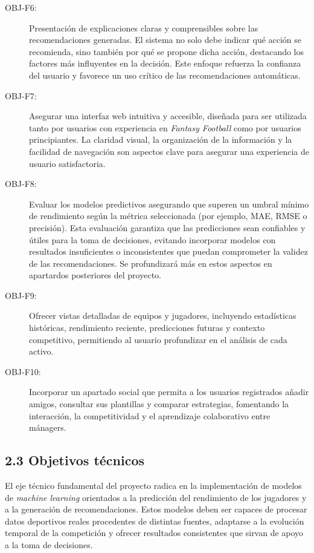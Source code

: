 \begin{description}
\item[OBJ-F6:] Presentación de explicaciones claras y comprensibles sobre las recomendaciones 
generadas. El sistema no solo debe indicar qué acción se recomienda, sino también por qué se 
propone dicha acción, destacando los factores más influyentes en la decisión. Este enfoque 
refuerza la confianza del usuario y favorece un uso crítico de las recomendaciones 
automáticas.

\item[OBJ-F7:] Asegurar una interfaz web intuitiva y accesible, diseñada para ser utilizada tanto 
por usuarios con experiencia en \textit{Fantasy Football} como por usuarios principiantes. La claridad 
visual, la organización de la información y la facilidad de navegación son aspectos clave para 
asegurar una experiencia de usuario satisfactoria.

\item[OBJ-F8:] Evaluar los modelos predictivos asegurando que superen un umbral mínimo de rendimiento 
según la métrica seleccionada (por ejemplo, MAE, RMSE o precisión). Esta evaluación garantiza 
que las predicciones sean confiables y útiles para la toma de decisiones, evitando incorporar 
modelos con resultados insuficientes o inconsistentes que puedan comprometer la validez de las 
recomendaciones. Se profundizará más en estos aspectos en apartardos posteriores del proyecto.

\item[OBJ-F9:] Ofrecer vistas detalladas de equipos y jugadores, incluyendo estadísticas históricas, 
rendimiento reciente, predicciones futuras y contexto competitivo, permitiendo al usuario 
profundizar en el análisis de cada activo.

\item[OBJ-F10:] Incorporar un apartado social que permita a los usuarios registrados añadir amigos, 
consultar sus plantillas y comparar estrategias, fomentando la interacción, la competitividad 
y el aprendizaje colaborativo entre mánagers.
\end{description}

\subsection{2.3 Objetivos técnicos}

El eje técnico fundamental del proyecto radica en la implementación de modelos de \textit{machine learning} orientados
 a la predicción del rendimiento de los jugadores y a la generación de recomendaciones. Estos modelos deben 
 ser capaces de procesar datos deportivos reales procedentes de distintas fuentes, adaptarse a la evolución 
 temporal de la competición y ofrecer resultados consistentes que sirvan de apoyo a la toma de decisiones.

